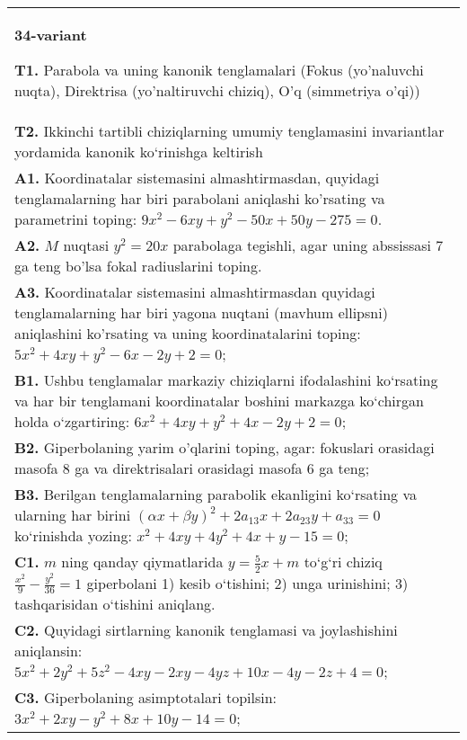\documentclass{article}
\begin{document}
\begin{tabular}{m{17cm}}
\textbf{34-variant}
\newline

\textbf{T1.} Parabola va uning kanonik tenglamalari (Fokus (yo’naluvchi nuqta), Direktrisa (yo’naltiruvchi chiziq), O’q (simmetriya o’qi)) \\
\textbf{T2.} Ikkinchi tartibli chiziqlarning umumiy tenglamasini invariantlar yordamida kanonik ko‘rinishga keltirish \\
\textbf{A1.} Koordinatalar sistemasini almashtirmasdan, quyidagi tenglamalarning har biri parabolani aniqlashi ko'rsating va parametrini toping: $9 x^2-6 x y+y^2-50 x+50 y-275=0$. \\
\textbf{A2.} $M$ nuqtasi $y^2=20 x$ parabolaga tegishli, agar uning abssissasi 7 ga teng bo'lsa fokal radiuslarini toping. \\
\textbf{A3.} Koordinatalar sistemasini almashtirmasdan quyidagi tenglamalarning har biri yagona nuqtani (mavhum ellipsni) aniqlashini ko'rsating va uning koordinatalarini toping: $5 x^2+4 x y+y^2-6 x-2 y+2=0$; \\
\textbf{B1.} Ushbu tenglamalar markaziy chiziqlarni ifodalashini ko‘rsating va har bir tenglamani koordinatalar boshini markazga ko‘chirgan holda o‘zgartiring: $6 x^2+4 x y+y^2+4 x-2 y+2=0$; \\
\textbf{B2.} Giperbolaning yarim o'qlarini toping, agar: fokuslari orasidagi masofa 8 ga va direktrisalari orasidagi masofa 6 ga teng; \\
\textbf{B3.} Berilgan tenglamalarning parabolik ekanligini ko‘rsating va ularning har birini $(\alpha x+\beta y)^2+2 a_{13} x+2 a_{23} y+a_{33}=0$ ko‘rinishda yozing: $x^2+4 x y+4 y^2+4 x+y-15=0 ;$ \\
\textbf{C1.} $m$ ning qanday qiymatlarida $y=\frac{5}{2} x+m$ to‘g‘ri chiziq $\frac{x^2}{9}-\frac{y^2}{36}=1$ giperbolani 1) kesib o‘tishini; 2) unga urinishini; 3) tashqarisidan o‘tishini aniqlang. \\
\textbf{C2.} Quyidagi sirtlarning kanonik tenglamasi va joylashishini aniqlansin: $5 x^2+2 y^2+5 z^2-4 x y-2 x y-4 y z+10 x-4 y-2 z+4=0$; \\
\textbf{C3.} Giperbolaning asimptotalari topilsin: $3 x^2+2 x y-y^2+8 x+10 y-14=0$; \\

\end{tabular}
\vspace{1cm}
\end{document}
